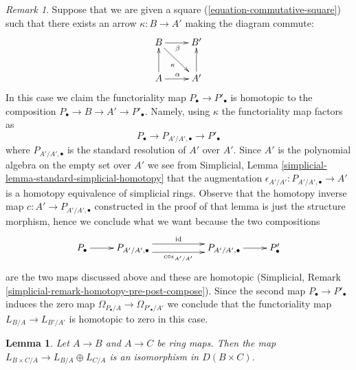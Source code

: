 \documentclass{stacks-project}
\theoremstyle{plain}
\newtheorem{lemma}[subsection]{Lemma}
\theoremstyle{definition}
\theoremstyle{remark}
\newtheorem{remark}[subsection]{Remark}
\numberwithin{equation}{subsection}
\begin{document}
\begin{remark}
\label{remark-homotopy-triangle}
Suppose that we are given a square (\ref{equation-commutative-square})
such that there exists an arrow $\kappa : B \to A'$ making the diagram
commute:
$$
\xymatrix{
B \ar[r]_\beta \ar[rd]_\kappa & B' \\
A \ar[u] \ar[r]^\alpha & A' \ar[u]
}
$$
In this case we claim the functoriality map $P_\bullet \to P'_\bullet$
is homotopic to the composition $P_\bullet \to B \to A' \to P'_\bullet$.
Namely, using $\kappa$ the functoriality map factors as
$$
P_\bullet \to P_{A'/A', \bullet} \to P'_\bullet
$$
where $P_{A'/A', \bullet}$ is the standard resolution of $A'$ over $A'$.
Since $A'$ is the polynomial algebra on the empty set over $A'$ we
see from Simplicial, Lemma \ref{simplicial-lemma-standard-simplicial-homotopy}
that the augmentation $\epsilon_{A'/A'} : P_{A'/A', \bullet} \to A'$
is a homotopy equivalence of simplicial rings. Observe that the homotopy
inverse map $c : A' \to P_{A'/A', \bullet}$ constructed in the proof of
that lemma is just the structure morphism, hence
we conclude what we want because the two compositions
$$
\xymatrix{
P_\bullet \ar[r] &
P_{A'/A', \bullet} \ar@<1ex>[rr]^{\text{id}}
\ar@<-1ex>[rr]_{c \circ \epsilon_{A'/A'}} & &
P_{A'/A', \bullet} \ar[r] &
P'_\bullet
}
$$
are the two maps discussed above and these are homotopic
(Simplicial, Remark \ref{simplicial-remark-homotopy-pre-post-compose}).
Since the second map $P_\bullet \to P'_\bullet$ induces the zero
map $\Omega_{P_\bullet/A} \to \Omega_{P'_\bullet/A'}$ we conclude
that the functoriality map $L_{B/A} \to L_{B'/A'}$ is homotopic
to zero in this case.
\end{remark}

\begin{lemma}
\label{lemma-cotangent-complex-product}
Let $A \to B$ and $A \to C$ be ring maps.
Then the map $L_{B \times C/A} \to L_{B/A} \oplus L_{C/A}$ is
an isomorphism in $D(B \times C)$.
\end{lemma}
\end{document}
